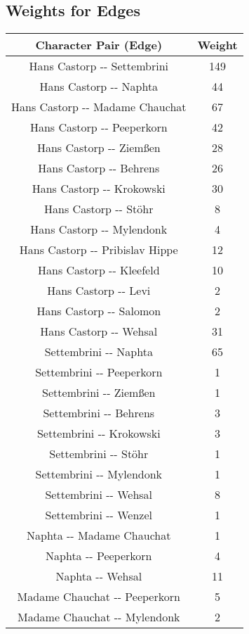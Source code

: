 \documentclass{article}%
\begin{document}
%
\subsection*{Weights for Edges}%
\begin{tabular}{|c|c|}%
\hline%
Character Pair (Edge)&Weight\\%
\hline%
Hans Castorp {-}{-} Settembrini&149\\%
\hline%
Hans Castorp {-}{-} Naphta&44\\%
\hline%
Hans Castorp {-}{-} Madame Chauchat&67\\%
\hline%
Hans Castorp {-}{-} Peeperkorn&42\\%
\hline%
Hans Castorp {-}{-} Ziemßen&28\\%
\hline%
Hans Castorp {-}{-} Behrens&26\\%
\hline%
Hans Castorp {-}{-} Krokowski&30\\%
\hline%
Hans Castorp {-}{-} Stöhr&8\\%
\hline%
Hans Castorp {-}{-} Mylendonk&4\\%
\hline%
Hans Castorp {-}{-} Pribislav Hippe&12\\%
\hline%
Hans Castorp {-}{-} Kleefeld&10\\%
\hline%
Hans Castorp {-}{-} Levi&2\\%
\hline%
Hans Castorp {-}{-} Salomon&2\\%
\hline%
Hans Castorp {-}{-} Wehsal&31\\%
\hline%
Settembrini {-}{-} Naphta&65\\%
\hline%
Settembrini {-}{-} Peeperkorn&1\\%
\hline%
Settembrini {-}{-} Ziemßen&1\\%
\hline%
Settembrini {-}{-} Behrens&3\\%
\hline%
Settembrini {-}{-} Krokowski&3\\%
\hline%
Settembrini {-}{-} Stöhr&1\\%
\hline%
Settembrini {-}{-} Mylendonk&1\\%
\hline%
Settembrini {-}{-} Wehsal&8\\%
\hline%
Settembrini {-}{-} Wenzel&1\\%
\hline%
Naphta {-}{-} Madame Chauchat&1\\%
\hline%
Naphta {-}{-} Peeperkorn&4\\%
\hline%
Naphta {-}{-} Wehsal&11\\%
\hline%
Madame Chauchat {-}{-} Peeperkorn&5\\%
\hline%
Madame Chauchat {-}{-} Mylendonk&2\\%

\end{tabular}
\end{document}
